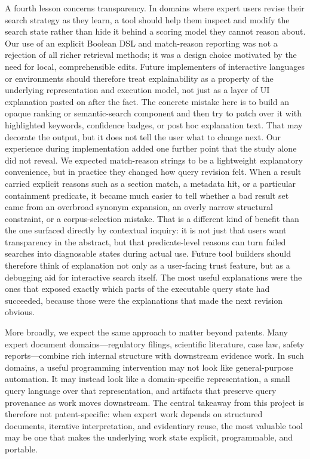 \documentclass[sigconf]{acmart}
\begin{document}
A fourth lesson concerns transparency. In domains where expert users revise
their search strategy as they learn, a tool should help them inspect and modify
the search state rather than hide it behind a scoring model they cannot reason
about. Our use of an explicit Boolean DSL and match-reason reporting was not a
rejection of all richer retrieval methods; it was a design choice motivated by
the need for local, comprehensible edits. Future implementers of interactive
languages or environments should therefore treat explainability as a property of
the underlying representation and execution model, not just as a layer of UI
explanation pasted on after the fact. The concrete mistake here is to build an
opaque ranking or semantic-search component and then try to patch over it with
highlighted keywords, confidence badges, or post hoc explanation text. That may
decorate the output, but it does not tell the user what to change next. Our
experience during implementation added one further point that the study alone
did not reveal. We expected match-reason strings to be a lightweight
explanatory convenience, but in practice they changed how query revision felt.
When a result carried explicit reasons such as a section match, a metadata hit,
or a particular containment predicate, it became much easier to tell whether a
bad result set came from an overbroad synonym expansion, an overly narrow
structural constraint, or a corpus-selection mistake. That is a different kind
of benefit than the one surfaced directly by contextual inquiry: it is not just
that users want transparency in the abstract, but that predicate-level reasons
can turn failed searches into diagnosable states during actual use. Future tool
builders should therefore think of explanation not only as a user-facing trust
feature, but as a debugging aid for interactive search itself. The most useful
explanations were the ones that exposed exactly which parts of the executable
query state had succeeded, because those were the explanations that made the
next revision obvious.

More broadly, we expect the same approach to matter beyond patents. Many expert
document domains---regulatory filings, scientific literature, case law, safety
reports---combine rich internal structure with downstream evidence work. In such
domains, a useful programming intervention may not look like general-purpose
automation. It may instead look like a domain-specific representation, a small
query language over that representation, and artifacts that preserve query
provenance as work moves downstream. The central takeaway from this project is
therefore not patent-specific: when expert work depends on structured documents,
iterative interpretation, and evidentiary reuse, the most valuable tool may be
one that makes the underlying work state explicit, programmable, and portable.
\end{document}
